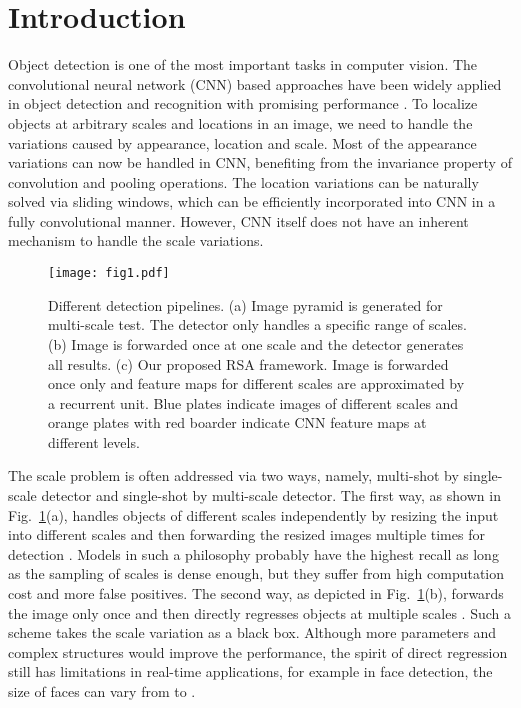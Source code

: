 \documentclass[10pt,twocolumn,letterpaper]{article}
\begin{document}
\section{Introduction}
\label{intro}
Object detection is one of the most important tasks in computer vision. The convolutional neural network (CNN) based approaches have been widely applied in object detection and recognition with promising performance \cite{fast_rcnn,resNet,faster_rcnn,zeng2016crafting,yu2016poi,liu2017quality,leng20163d, li2017we, liu2017learning}. To localize objects at arbitrary scales and locations in an image, we need to handle the variations caused by appearance, location and scale. Most of the appearance variations can now be handled in CNN, benefiting from the invariance property of convolution and pooling operations. The location variations can be naturally solved via sliding windows, which can be efficiently incorporated into CNN in a fully convolutional manner. However, CNN itself does not have an inherent mechanism to handle the scale variations. 



\begin{figure}[t]
	\begin{center}
\texttt{[image: fig1.pdf]}
	\end{center}
	\vspace{-.1cm}
\caption{Different detection pipelines. (a) Image pyramid is generated for multi-scale test. The detector only handles a specific range of scales. (b) Image is forwarded once at one scale and the detector generates all results. (c) Our proposed RSA framework. Image is forwarded once only and feature maps for different scales are approximated by a recurrent unit. Blue plates indicate images of different scales and orange plates with red boarder indicate CNN feature maps at different levels.	}
	\label{fig1}
	\vspace{-.3cm}
\end{figure}
The scale problem is often addressed via two ways, namely, multi-shot by single-scale detector and single-shot by multi-scale detector. The first way, as shown in Fig.~\ref{fig1}(a), handles objects of different scales independently by resizing the input into different scales and then forwarding the resized images multiple times 
for detection \cite{overfeat,li2015convolutional,chen2016supervised}. 
Models in such a philosophy  probably have the highest recall as long as the sampling of scales is dense enough, but they suffer from high computation cost and more false positives. 
The second way, as depicted in Fig.~\ref{fig1}(b), forwards the image only once and then directly regresses objects at multiple scales \cite{faster_rcnn,redmon2016you,liu2016ssd}.
Such a scheme takes the scale variation as a black box. Although more parameters and complex structures would improve the performance, the spirit of direct regression still has limitations in real-time applications, for example in face detection, the size of faces can vary from  to . 
\end{document}
